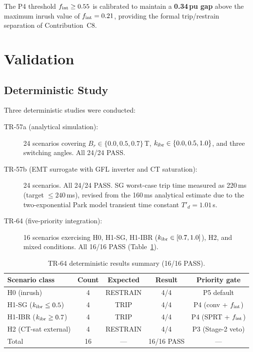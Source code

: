 The P4 threshold $f_{\rm int} \geq 0.55$ is calibrated to maintain a
\textbf{0.34\,pu gap} above the maximum inrush value of $f_{\rm int} = 0.21$,
providing the formal trip/restrain separation of Contribution~C8.

\section{Validation}
\label{sec:ch5_validation}

\subsection{Deterministic Study}
\label{sec:ch5_det}

Three deterministic studies were conducted:

\begin{description}
  \item[TR-57a (analytical simulation):] 24 scenarios covering
    $B_r \in \{0.0, 0.5, 0.7\}$\,T, $k_{\rm ibr} \in \{0.0, 0.5, 1.0\}$,
    and three switching angles.  All 24/24 PASS.

  \item[TR-57b (EMT surrogate with GFL inverter and CT saturation):] 24
    scenarios.  All 24/24 PASS.  SG worst-case trip time measured as
    220\,ms (target $\leq 240$\,ms), revised from the 160\,ms analytical
    estimate due to the two-exponential Park model transient time constant
    $T'_d = 1.01$\,s.

  \item[TR-64 (five-priority integration):] 16 scenarios exercising
    H0, H1-SG, H1-IBR ($k_{\rm ibr} \in [0.7, 1.0]$), H2, and mixed
    conditions.  All 16/16 PASS (Table~\ref{tab:ch5_det}).
\end{description}

\begin{table}[htbp]
  \centering
  \caption{TR-64 deterministic results summary (16/16 PASS).}
  \label{tab:ch5_det}
  \begin{tabular}{lcccc}
    \toprule
    Scenario class & Count & Expected & Result & Priority gate \\
    \midrule
    H0 (inrush)          & 4  & RESTRAIN & 4/4  & P5 default \\
    H1-SG ($k_{\rm ibr} \leq 0.5$)  & 4 & TRIP & 4/4  & P4 (conv + $f_{\rm int}$) \\
    H1-IBR ($k_{\rm ibr} \geq 0.7$) & 4 & TRIP & 4/4  & P4 (SPRT + $f_{\rm int}$) \\
    H2 (CT-sat external) & 4  & RESTRAIN & 4/4  & P3 (Stage-2 veto) \\
    \midrule
    Total                & 16 & —        & 16/16 PASS & — \\
    \bottomrule
  \end{tabular}
\end{table}

